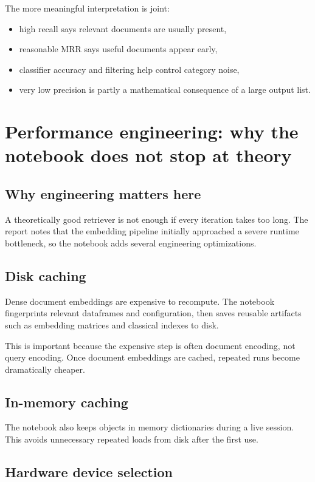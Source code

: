 \documentclass[10pt]{article}
\begin{document}
The more meaningful interpretation is joint:
\begin{itemize}
    \item high recall says relevant documents are usually present,
    \item reasonable MRR says useful documents appear early,
    \item classifier accuracy and filtering help control category noise,
    \item very low precision is partly a mathematical consequence of a large output list.
\end{itemize}

\section{Performance engineering: why the notebook does not stop at theory}
\label{sec:eng}

\subsection{Why engineering matters here}

A theoretically good retriever is not enough if every iteration takes too long. The report notes that the embedding pipeline initially approached a severe runtime bottleneck, so the notebook adds several engineering optimizations.

\subsection{Disk caching}

Dense document embeddings are expensive to recompute. The notebook fingerprints relevant dataframes and configuration, then saves reusable artifacts such as embedding matrices and classical indexes to disk.

This is important because the expensive step is often document encoding, not query encoding. Once document embeddings are cached, repeated runs become dramatically cheaper.

\subsection{In-memory caching}

The notebook also keeps objects in memory dictionaries during a live session. This avoids unnecessary repeated loads from disk after the first use.

\subsection{Hardware device selection}
\end{document}
